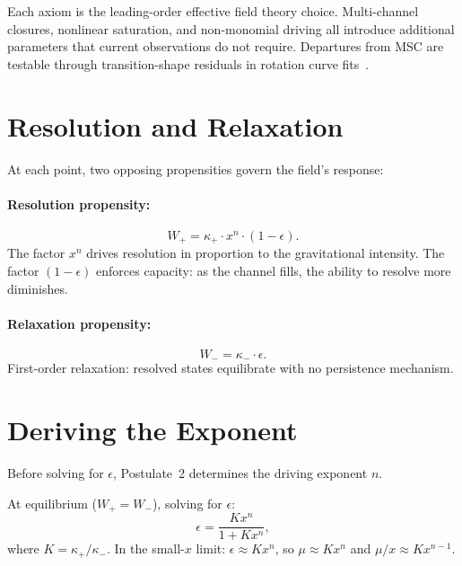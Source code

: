 \documentclass[twocolumn]{iopjournal}
\begin{document}
Each axiom is the leading-order effective field theory choice.
Multi-channel closures, nonlinear saturation, and non-monomial
driving all introduce additional parameters that current
observations do not require. Departures from MSC are testable
through transition-shape residuals in rotation curve
fits~\cite{FamaeyBinney2005}.


\section*{Resolution and Relaxation}

At each point, two opposing propensities govern the field's
response:

\paragraph{Resolution propensity:}
\begin{equation}
  W_+ = \kappa_+ \cdot x^n \cdot (1 - \epsilon).
  \label{eq:Wplus}
\end{equation}
The factor $x^n$ drives resolution in proportion to the
gravitational intensity. The factor $(1 - \epsilon)$ enforces
capacity: as the channel fills, the ability to resolve more
diminishes.

\paragraph{Relaxation propensity:}
\begin{equation}
  W_- = \kappa_- \cdot \epsilon.
  \label{eq:Wminus}
\end{equation}
First-order relaxation: resolved states equilibrate with no
persistence mechanism.


\section*{Deriving the Exponent}

Before solving for $\epsilon$, Postulate~2 determines the
driving exponent $n$.

At equilibrium ($W_+ = W_-$), solving for $\epsilon$:
\begin{equation}
  \epsilon = \frac{K x^n}{1 + K x^n},
  \label{eq:epsilon_general}
\end{equation}
where $K = \kappa_+/\kappa_-$. In the small-$x$ limit:
$\epsilon \approx K x^n$, so $\mu \approx K x^n$ and
$\mu/x \approx K x^{n-1}$.
\end{document}
